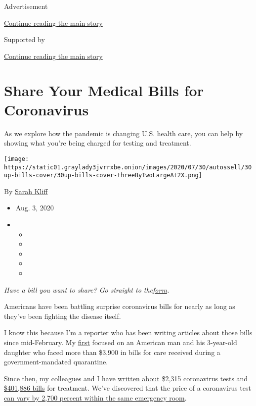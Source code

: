 Advertisement

\protect\hyperlink{after-top}{Continue reading the main story}

Supported by

\protect\hyperlink{after-sponsor}{Continue reading the main story}

\hypertarget{share-your-medical-bills-for-coronavirus}{%
\section{Share Your Medical Bills for
Coronavirus}\label{share-your-medical-bills-for-coronavirus}}

As we explore how the pandemic is changing U.S. health care, you can
help by showing what you're being charged for testing and treatment.

\texttt{[image: https://static01.graylady3jvrrxbe.onion/images/2020/07/30/autossell/30up-bills-cover/30up-bills-cover-threeByTwoLargeAt2X.png]}

By \href{https://www.nytimes3xbfgragh.onion/by/sarah-kliff}{Sarah Kliff}

\begin{itemize}
\item
  Aug. 3, 2020
\item
  \begin{itemize}
  \item
  \item
  \item
  \item
  \item
  \end{itemize}
\end{itemize}

\emph{Have a bill you want to share? Go straight to
the}\href{https://www.nytimes3xbfgragh.onion/2020/08/03/reader-center/coronavirus-medical-bills.html\#link-61196606}{\emph{form}}\emph{.}

Americans have been battling surprise coronavirus bills for nearly as
long as they've been fighting the disease itself.

I know this because I'm a reporter who has been writing articles about
those bills since mid-February. My
\href{https://www.nytimes3xbfgragh.onion/2020/02/29/upshot/coronavirus-surprise-medical-bills.html}{first}
focused on an American man and his 3-year-old daughter who faced more
than \$3,900 in bills for care received during a government-mandated
quarantine.

Since then, my colleagues and I have
\href{https://www.nytimes3xbfgragh.onion/2020/06/16/upshot/coronavirus-test-cost-varies-widely.html}{written
about} \$2,315 coronavirus tests and
\href{https://www.nytimes3xbfgragh.onion/2020/06/14/nyregion/coronavirus-billing-nyc.html}{\$401,886
bills} for treatment. We've discovered that the price of a coronavirus
test
\href{https://www.nytimes3xbfgragh.onion/2020/06/29/upshot/coronavirus-tests-unpredictable-prices.html}{can
vary by 2,700 percent within the same emergency room}.

